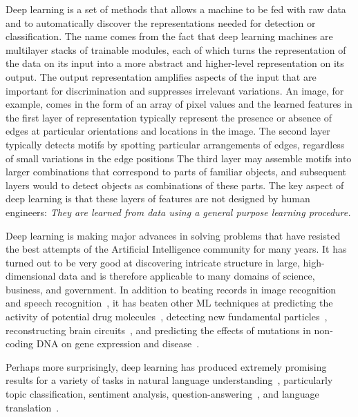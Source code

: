 \documentclass[10pts]{article}
\begin{document}
Deep learning is a set of methods that allows a machine to be fed with
raw data and to automatically discover the representations needed for
detection or classification. The name comes from the fact that deep learning machines are
multilayer stacks of trainable modules, each of which turns the
representation of the data on its input into a more abstract and
higher-level representation on its output. The output representation
amplifies aspects of the input that are important for discrimination
and suppresses irrelevant variations. An image, for example, comes in the form of an array of
pixel values and the learned features in the first layer of representation
typically represent the presence
or absence of edges at  particular orientations and locations in
the image. The second layer typically detects motifs by spotting particular
arrangements of edges, regardless of small variations in the edge positions
The third layer  may assemble motifs into larger
combinations that correspond to parts of familiar
objects, and subsequent layers would to detect objects as combinations of
these parts. The key aspect of deep learning is that these layers of
features are not designed by human engineers: {\em They are learned from
data using a general purpose learning procedure.}

Deep learning is making major advances in solving problems that have
resisted the best attempts of the Artificial Intelligence community
for many years. It has turned out to be very good at discovering
intricate structure in large, high-dimensional data and is therefore
applicable to many domains of science, business, and government. In
addition to beating records in image
recognition~\citep{Krizhevsky-2012-small,farabet-pami-13,tompson-nips-14,szegedy-2014}
and speech
recognition~\citep{Hinton-et-al-2012,Sainath-et-al-ICASSP2013}, it has
beaten other ML techniques at predicting the activity of potential
drug molecules~\citep{Ma-et-al-2015}, detecting new fundamental
particles~\citep{Ciodaro-et-al-2012,Melis-Higgs-boson-competition-2014},
reconstructing brain circuits~\citep{helmstaedter-nature-2013}, and
predicting the effects of mutations in non-coding DNA on gene
expression and disease~\citep{Keung-et-al-2014,Xiong-et-al-Frey-science2015}.

Perhaps more surprisingly, deep learning has produced extremely
promising results for a variety of tasks in natural language
understanding~\citep{collobert:2011b}, particularly topic
classification, %
sentiment
analysis, %
question-answering~\cite{Bordes-et-al-EMNLP2014}, and language
translation~\cite{Jean-et-al-arxiv2014,Sutskever-et-al-NIPS2014}.
\end{document}
